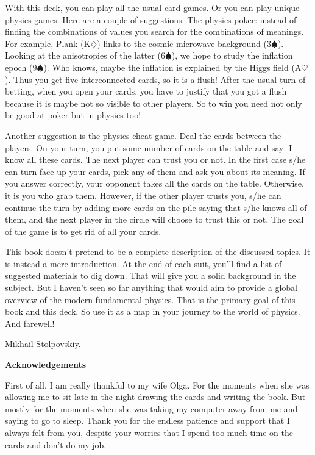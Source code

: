 \documentclass[]{bookest}
\begin{document}
With this deck, you can play all the usual card games. Or you can play unique physics games. Here are a couple of suggestions. The physics poker: instead of finding the combinations of values you search for the combinations of meanings. For example, Plank (K$\diamondsuit$) links to the cosmic microwave background (3$\spadesuit$). Looking at the anisotropies of the latter (6$\spadesuit$), we hope to study the inflation epoch (9$\spadesuit$). Who knows, maybe the inflation is explained by the Higgs field (A$\heartsuit$). Thus you get five interconnected cards, so it is a flush! After the usual turn of betting, when you open your cards, you have to justify that you got a flush because it is maybe not so visible to other players. So to win you need not only be good at poker but in physics too!

Another suggestion is the physics cheat game. Deal the cards between the players. On your turn, you put some number of cards on the table and say: I know all these cards. The next player can trust you or not. In the first case s/he can turn face up your cards, pick any of them and ask you about its meaning. If you answer correctly, your opponent takes all the cards on the table. Otherwise, it is you who grab them. However, if the other player trusts you, s/he can continue the turn by adding more cards on the pile saying that s/he knows all of them, and the next player in the circle will choose to trust this or not. The goal of the game is to get rid of all your cards.

This book doesn't pretend to be a complete description of the discussed topics. It is instead a mere introduction. At the end of each suit, you'll find a list of suggested materials to dig down. That will give you a solid background in the subject. But I haven't seen so far anything that would aim to provide a global overview of the modern fundamental physics. That is the primary goal of this book and this deck. So use it as a map in your journey to the world of physics. And farewell!

Mikhail Stolpovskiy.

\newpage


{\huge{\textbf{Acknowledgements}}}
\vskip12pt

First of all, I am really thankful to my wife Olga. For the moments when she was allowing me to sit late in the night drawing the cards and writing the book. But mostly for the moments when she was taking my computer away from me and saying to go to sleep. Thank you for the endless patience and support that I always felt from you, despite your worries that I spend too much time on the cards and don't do my job.
\end{document}
